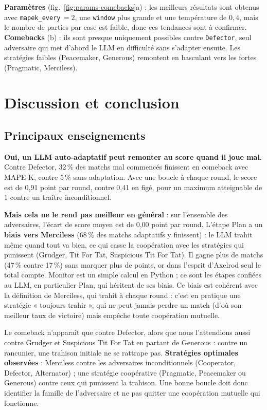 \documentclass[10pt,a4paper]{article}
\begin{document}
\textbf{Paramètres} (fig.~\ref{fig:params-comebacks}a) : les meilleurs résultats
sont obtenus avec \texttt{mapek\_every}\,$=2$, une \texttt{window} plus grande et
une température de $0{,}4$, mais le nombre de parties par case est faible, donc
ces tendances sont à confirmer. \textbf{Comebacks} (b) : ils sont presque
uniquement possibles contre \texttt{Defector}, seul adversaire qui met d'abord le
LLM en difficulté sans s'adapter ensuite. Les stratégies faibles (Peacemaker,
Generous) remontent en basculant vers les fortes (Pragmatic, Merciless).

\section{Discussion et conclusion}

\subsection{Principaux enseignements}

\textbf{Oui, un LLM auto-adaptatif peut remonter au score quand il joue mal.}
Contre Defector, 32\,\% des matchs mal commencés finissent en comeback avec
MAPE-K, contre 5\,\% sans adaptation. Avec une boucle à chaque round, le score
est de 0,91 point par round, contre 0,41 en figé, pour un maximum atteignable de 1
contre un traître inconditionnel.

\textbf{Mais cela ne le rend pas meilleur en général} : sur l'ensemble des
adversaires, l'écart de score moyen est de 0,00 point par round. L'étape Plan a un
\textbf{biais vers Merciless} (68\,\% des matchs adaptatifs y finissent) : le LLM
trahit même quand tout va bien, ce qui casse la coopération avec les stratégies
qui punissent (Grudger, Tit For Tat, Suspicious Tit For Tat). Il gagne plus de
matchs (47\,\% contre 17\,\%) sans marquer plus de points, or dans l'esprit
d'Axelrod seul le total compte. Monitor est un simple calcul en Python ; ce sont les
étapes confiées au LLM, en particulier Plan, qui héritent de ses biais. Ce biais est
cohérent avec la définition de Merciless, qui trahit à chaque round : c'est en
pratique une stratégie « toujours trahir », qui ne peut jamais perdre un match
(d'où son meilleur taux de victoire) mais empêche toute coopération mutuelle.

Le comeback n'apparaît que contre Defector, alors que nous
l'attendions aussi contre Grudger et Suspicious Tit For Tat en partant de Generous :
contre un rancunier, une trahison initiale ne se rattrape pas.
\textbf{Stratégies optimales observées} : Merciless contre les adversaires
inconditionnels (Cooperator, Defector, Alternator) ; une stratégie coopérative
(Pragmatic, Peacemaker ou Generous) contre ceux qui punissent la trahison. Une
bonne boucle doit donc identifier la famille de l'adversaire et ne pas quitter
une coopération mutuelle qui fonctionne.
\end{document}

